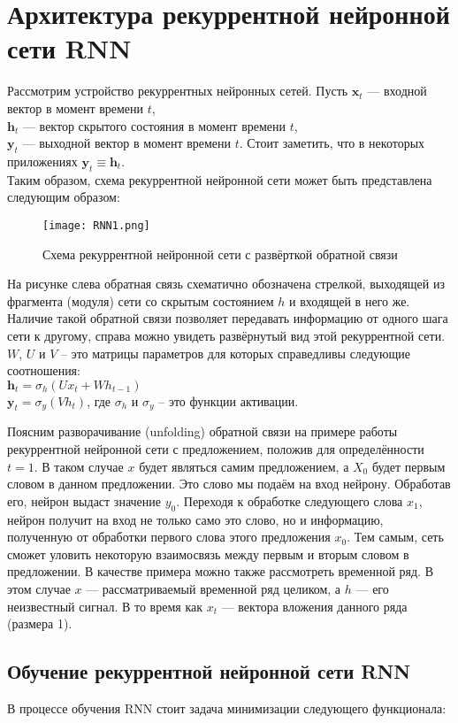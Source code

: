 \documentclass{article}
\begin{document}
\section{Архитектура рекуррентной нейронной сети RNN}
Рассмотрим устройство рекуррентных нейронных сетей. 
Пусть $\boldsymbol{x}_t$ — входной вектор в момент времени $t$,\\ $\boldsymbol{h}_t$ — вектор скрытого состояния в момент времени $t$,\\
$\boldsymbol{y}_t$ — выходной вектор в момент времени $t$. Стоит заметить, что в некоторых приложениях
$\boldsymbol{y}_t \equiv \boldsymbol{h}_t$. \\
Таким образом, схема рекуррентной нейронной сети может быть представлена следующим образом:
\begin{figure}[H]
	        \centering
	        \texttt{[image: RNN1.png]}
	        \caption{Схема рекуррентной нейронной сети с развёрткой обратной связи}
	        \label{fig:my_label}
	    \end{figure}

На рисунке слева обратная связь схематично обозначена стрелкой, выходящей
из фрагмента (модуля) сети со скрытым состоянием $h$ и входящей в него же. Наличие такой обратной связи позволяет передавать информацию от одного шага сети к
другому, справа можно увидеть развёрнутый вид этой рекуррентной сети.
$W$, $U$ и $V$ -- это матрицы параметров для которых справедливы следующие соотношения:\\
$\boldsymbol{h}_t = \sigma_h(Ux_t + Wh_{t-1})$\\
$\boldsymbol{y}_t = \sigma_y (Vh_t) $, где $\sigma_h$ и $\sigma_y$ -- это функции активации.


Поясним разворачивание (unfolding) обратной связи на примере работы рекуррентной нейронной сети с предложением, положив для определённости $t = 1$. В таком случае $x$ будет являться самим предложением, а $X_0$ будет первым словом в данном предложении. Это слово мы подаём на вход нейрону. Обработав его, нейрон выдаст значение $y_0$.
Переходя к обработке следующего слова $x_1$, нейрон получит на вход не только само это
слово, но и информацию, полученную от обработки первого слова этого предложения
$x_0$. Тем самым, сеть сможет уловить некоторую взаимосвязь между первым и вторым
словом в предложении. В качестве примера можно также рассмотреть временной ряд.
В этом случае $x$ — рассматриваемый временной ряд целиком, а $h$ — его неизвестный
сигнал. В то время как $x_t$ — вектора вложения данного ряда (размера 1).
\subsection{Обучение рекуррентной нейронной сети RNN}	
В процессе обучения RNN стоит задача минимизации следующего функционала:
\end{document}
